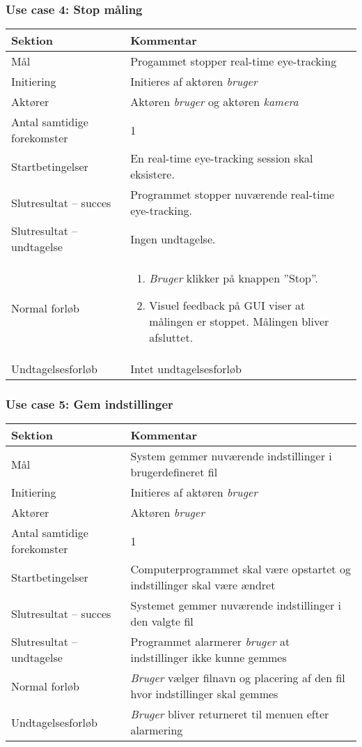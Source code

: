 \documentclass[kravspec.tex]{subfiles}
\begin{document}
	\subsubsection{Use case 4: Stop måling}
		\begin{tabular}{|l|p{7.7cm}|}
			\hline \textbf{Sektion} 	& \textbf{Kommentar} \\ 
			\hline Mål  & Progammet stopper real-time eye-tracking \\ 
			\hline Initiering  & Initieres af aktøren \textit{bruger} \\ 
			\hline Aktører & Aktøren \textit{bruger} og aktøren \textit{kamera} \\ 
			\hline Antal samtidige forekomster & 1 \\ 
			\hline Startbetingelser & En real-time eye-tracking session skal eksistere.   \\ 
			\hline Slutresultat – succes & Programmet stopper nuværende real-time eye-tracking.\\ 
			\hline Slutresultat – undtagelse & Ingen undtagelse. \\ 
			\hline Normal forløb & \begin{enumerate}
				\item \textit{Bruger} klikker på knappen ”Stop”.
				\item Visuel feedback på GUI viser at målingen er stoppet. Målingen bliver afsluttet. 
			\end{enumerate} \\ 
			\hline Undtagelsesforløb & Intet undtagelsesforløb \\ 
			\hline 
		\end{tabular}

	\subsubsection{Use case 5: Gem indstillinger}
	\begin{tabular}{|l|p{7.7cm}|}
		\hline \textbf{Sektion} 	& \textbf{Kommentar} \\ 
		\hline Mål  & System gemmer nuværende indstillinger i brugerdefineret fil \\ 
		\hline Initiering  & Initieres af aktøren \textit{bruger} \\ 
		\hline Aktører & Aktøren \textit{bruger} \\ 
		\hline Antal samtidige forekomster & 1 \\ 
		\hline Startbetingelser & Computerprogrammet skal være opstartet og indstillinger skal være ændret  \\ 
		\hline Slutresultat – succes & Systemet gemmer nuværende indstillinger i den valgte fil \\ 
		\hline Slutresultat – undtagelse & Programmet alarmerer \textit{bruger} at indstillinger ikke kunne gemmes \\ 
		\hline Normal forløb & \textit{Bruger} vælger filnavn og placering af den fil hvor indstillinger skal gemmes \\ 
		\hline Undtagelsesforløb & \textit{Bruger} bliver returneret til menuen efter alarmering \\ 
		\hline 
	\end{tabular}
	
\end{document}
